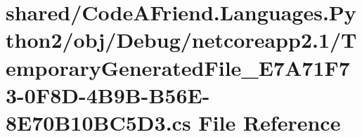 \hypertarget{shared_2_code_a_friend_8_languages_8_python2_2obj_2_debug_2netcoreapp2_81_2_temporary_generated_2047050b27bf60d90332753c12284c60}{}\section{shared/\+Code\+A\+Friend.Languages.\+Python2/obj/\+Debug/netcoreapp2.1/\+Temporary\+Generated\+File\+\_\+\+E7\+A71\+F73-\/0\+F8\+D-\/4\+B9\+B-\/\+B56\+E-\/8\+E70\+B10\+B\+C5\+D3.cs File Reference}
\label{shared_2_code_a_friend_8_languages_8_python2_2obj_2_debug_2netcoreapp2_81_2_temporary_generated_2047050b27bf60d90332753c12284c60}
